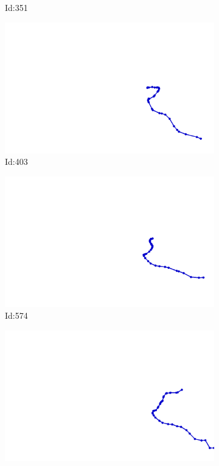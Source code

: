 \documentclass[12pt,twoside]{report}
\begin{document}
\begin{figure}
\begin{subfigure}[b]{0.20\textwidth}
\caption{Id:351}
\end{subfigure}
\begin{subfigure}[b]{0.20\textwidth}
\centering
\includegraphics[width=\textwidth]{../../trajectories/403.png}
\caption{Id:403}
\end{subfigure}
\begin{subfigure}[b]{0.20\textwidth}
\centering
\includegraphics[width=\textwidth]{../../trajectories/574.png}
\caption{Id:574}
\end{subfigure}
\begin{subfigure}[b]{0.20\textwidth}
\centering
\includegraphics[width=\textwidth]{../../trajectories/588.png}

\end{subfigure}
\end{figure}
\end{document}
